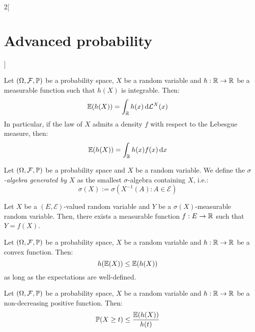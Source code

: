 \documentclass[../../../main_math.tex]{subfiles}
\begin{document}
\begin{multicols}{2}[\section{Advanced probability}]
\begin{proposition}
    Let $(\Omega,\mathcal{F},\mathbb{P})$ be a probability space, $X$ be a random variable and $h:\mathbb{R}\to \mathbb{R}$ be a measurable function such that $h(X)$ is integrable. Then:
    $$
      \mathbb{E}(h(X))=\int_{\mathbb{R}}{h(x)\dd{\mathcal{L}^X(x)}}
    $$
    In particular, if the law of $X$ admits a density $f$ with respect to the Lebesgue measure, then:
    $$
      \mathbb{E}(h(X))=\int_{\mathbb{R}}{h(x)f(x)\dd{x}}
    $$
  \end{proposition}
  \begin{definition}
    Let $(\Omega,\mathcal{F},\mathbb{P})$ be a probability space and $X$ be a random variable. We define the \emph{$\sigma$-algebra generated by $X$} as the smallest $\sigma$-algebra containing $X$, i.e.:
    $$
      \sigma(X):=\sigma(X^{-1}(A):A\in\mathcal{E})
    $$
  \end{definition}
  \begin{proposition}
    Let $X$ be a $(E,\mathcal{E})$-valued random variable and $Y$ be a $\sigma(X)$-measurable random variable. Then, there exists a measurable function $f:E\to \mathbb{R}$ such that $Y=f(X)$.
  \end{proposition}
  \begin{proposition}
    Let $(\Omega,\mathcal{F},\mathbb{P})$ be a probability space, $X$ be a random variable and $h:\mathbb{R}\to \mathbb{R}$ be a convex function. Then:
    $$
      h(\mathbb{E}(X))\leq \mathbb{E}(h(X))
    $$
    as long as the expectations are well-defined.
  \end{proposition}
  \begin{proposition}
    Let $(\Omega,\mathcal{F},\mathbb{P})$ be a probability space, $X$ be a random variable and $h:\mathbb{R}\to \mathbb{R}$ be a non-decreasing positive function. Then:
    $$
      \mathbb{P}(X\geq t)\leq \frac{\mathbb{E}(h(X))}{h(t)}
    $$
  \end{proposition}

\end{multicols}
\end{document}
